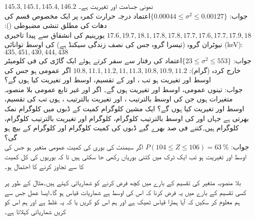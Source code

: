 \quad
$145.3, 145.1, 145.4,146.2$
\quad
نمونی جسامت  اور تغیریت  ہے۔\\
جواب:\quad
$\text{اعتماد} \{0.00044\le \sigma^2\le 0.00127\}$
\quad
درجہ حرارت کمرہ پر ایک مخصوص قسم کی دھات کی مطلق تنشی مضبوطی ():
$17.6,19.7,18.1,17.8,17.8,17.7,17.6,17.7,17.9,18$
\quad
یورینیم  کی انشقاق سے پیدا تاخیری نیوٹران  گروہ (تیسرا گروہ جس کی نصف زندگی  سیکنڈ ہے) کی اوسط توانائی (\si{\kilo\electronvolt}):
$435,451,430,444,438$\\
جواب:\quad
$\text{اعتماد} \{23\le\sigma^2\le553\}$
\quad
{} کی رفتار سے سفر کرتے ہوئے ایک گاڑی کی فی کلومیٹر خارج کردہ
  (گرام): $10.8,11.1,11.2,11,11.3,10.8,10.9,11.2$  
\quad
اگر  عمومی ہو جس کی اوسط  اور تغیریت  ہو تب ،  اور  کے تقسیم، اوسط اور تغیریت کیا ہوں گے؟\\
جواب:\quad
تینوں عمومی، اوسط  اور تغیریت  ہوں گے۔
\quad
اگر  اور  غیر تابع عمومی بلا منصوبہ متغیرات ہوں جن کی اوسط بالترتیب ،  اور تغیریت  بالترتیب ،   ہوں تب  کی تقسیم، اوسط اور تغیریت کیا ہوں گے؟
\quad
ایک مشین  کلوگرام کمیت کے ڈبوں میں  کلوگرام نمک بھرتی ہے جہاں  اور  کی اوسط بالترتیب  کلوگرام،  کلوگرام اور تغیریت بالترتیب  کلوگرام،  کلوگرام ہیں۔کتنے فی صد بھرے گیے  ڈبوں کی کمیت  کلوگرام اور  کلوگرام کے بیچ ہو گی؟\\
جواب:\quad
$P(104\le Z\le 106)=\SI{63}{\percent}$
\quad
اگر سیمنٹ کی بوری کی کمیت  عمومی متغیر ہو جس کی اوسط  اور تغیریت  ہو تب ایک ٹرک میں کتنی بوریاں رکھی جا سکتی ہیں تا کہ بوریوں کی  کل کمیت کا  سے تجاوز کرنے کا احتمال  ہو۔

بلا منصوبہ متغیر کی تقسیم کے بارے میں کچھ فرض کرنے کو شماریاتی  کہتے ہیں۔مثال کے طور پر کسی تقسیم کے بارے میں یہ فرض کرنا کہ اس کی اوسط  ہے شماریات قیاس ہو گا۔ایسا عمل  جس سے ہم معلوم کر سکیں کہ آیا ہمارا قیاس  ٹھیک ہے اور ہم اس کو  کریں یا کہ یہ غلط ہے اور ہم اس کو  کریں شماریاتی  کہلاتا ہے۔

